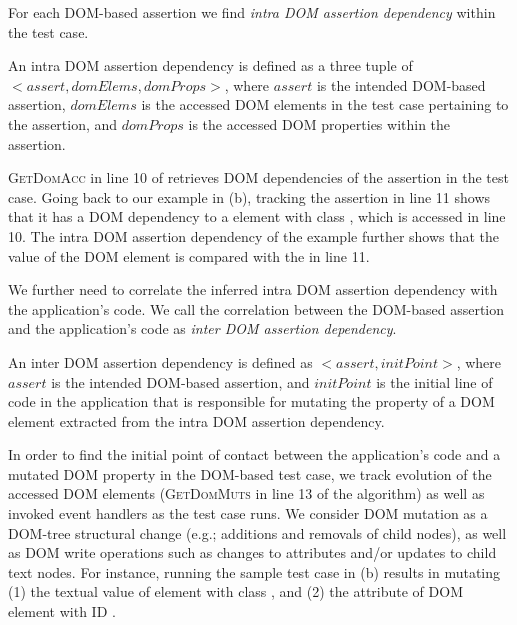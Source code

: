For each DOM-based assertion we find \emph{intra DOM assertion dependency} within the test case.
\begin{mydef}
\label{def:intraDOMDep}  
An intra DOM assertion dependency is defined as a three tuple of $<assert, domElems, domProps>$, where $assert$ is the intended DOM-based assertion, $domElems$ is the accessed DOM elements in the test case pertaining to the assertion, and $domProps$ is the accessed DOM properties within the assertion.
\end{mydef}
\textsc{GetDomAcc} in line 10 of  retrieves DOM dependencies of the assertion in the test case.
Going back to our example in (b), tracking the assertion in line 11 shows that it has a DOM dependency to a  element with class , which is accessed in line 10. The intra DOM assertion dependency of the example further shows that the  value of the DOM element is compared with the  in line 11.    

We further need to correlate the inferred intra DOM assertion dependency with the application's code.
We call the correlation between the DOM-based assertion and the application's code as \emph{inter DOM assertion dependency}.
\begin{mydef}
\label{def:interDOMDep}  
An inter DOM assertion dependency is defined as
$<assert, initPoint>$, where $assert$ is the intended DOM-based assertion, and $initPoint$ is the initial line of code in the application that is responsible for mutating the property of a DOM element extracted from the intra DOM assertion dependency.
\end{mydef}
In order to find the initial point of contact between the application's code and a mutated DOM property in the DOM-based test case, we track evolution of the accessed DOM elements (\textsc{GetDomMuts} in line 13 of the algorithm) as well as invoked event handlers as the test case runs. 
We consider DOM mutation as a DOM-tree structural change (e.g.; additions and removals of child nodes), as well as DOM write operations such as changes to attributes and/or updates to child text nodes. For instance, running the sample test case in (b) results in mutating (1) the textual value of  element with class , and (2) the  attribute of DOM element with ID .

